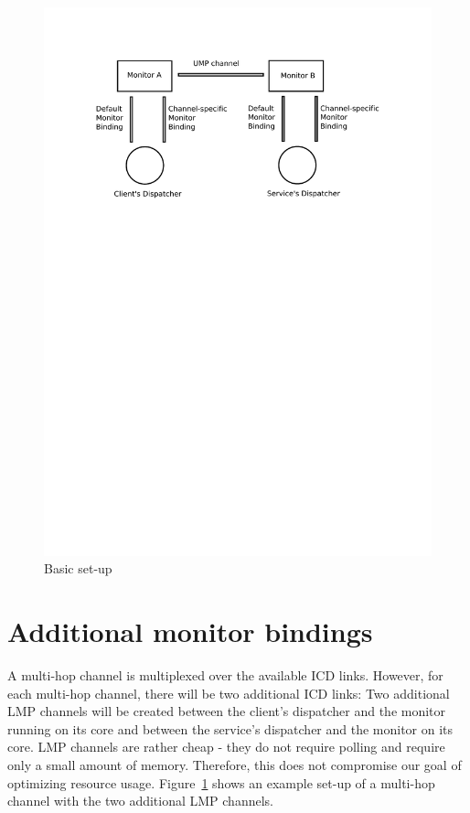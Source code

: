 \documentclass[a4paper,twoside]{report} %
\begin{document}
\begin{figure}[h]
	\begin{center}
 	\includegraphics[scale=0.7]{overview_multihop_channel.pdf}
 	\caption{Basic set-up}\label{fig:multihop-chan}
 	\end{center}
\end{figure}

\section{Additional monitor bindings}
A multi-hop channel is multiplexed over the available ICD links. However, for each multi-hop channel, there will be two additional ICD links: Two additional LMP channels will be created between the client's dispatcher and the monitor running on its core and between the service's dispatcher and the monitor on its core. LMP channels are rather cheap - they do not require polling and require only a small amount of memory. Therefore, this does not compromise our goal of optimizing resource usage. Figure~\ref{fig:multihop-chan} shows an example set-up of a multi-hop channel with the two additional LMP channels. 
\end{document}
